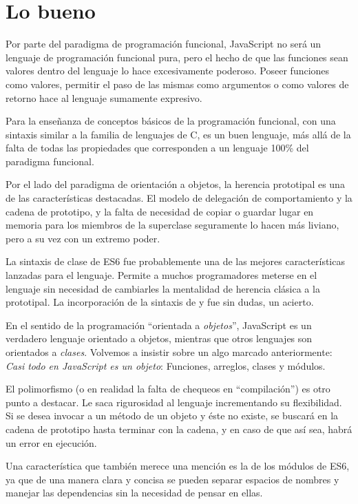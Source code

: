 \section{Lo bueno}

Por parte del paradigma de programación funcional, JavaScript no será un lenguaje de programación funcional pura, pero el hecho de que las funciones sean valores dentro del lenguaje lo hace excesivamente poderoso. Poseer funciones como valores, permitir el paso de las mismas como argumentos o como valores de retorno hace al lenguaje sumamente expresivo.

Para la enseñanza de conceptos básicos de la programación funcional, con una sintaxis similar a la familia de lenguajes de C, es un buen lenguaje, más allá de la falta de todas las propiedades que corresponden a un lenguaje 100\% del paradigma funcional.

Por el lado del paradigma de orientación a objetos, la herencia prototipal es una de las características destacadas. El modelo de delegación de comportamiento y la cadena de prototipo, y la falta de necesidad de copiar o guardar lugar en memoria para los miembros de la superclase seguramente lo hacen más liviano, pero a su vez con un extremo poder.
 
La sintaxis de clase de ES6 fue probablemente una de las mejores características lanzadas para el lenguaje. Permite a muchos programadores meterse en el lenguaje sin necesidad de cambiarles la mentalidad de herencia clásica a la prototipal. La incorporación de la sintaxis de  y  fue sin dudas, un acierto.

En el sentido de la programación "`orientada a \textit{objetos}"', JavaScript es un verdadero lenguaje orientado a objetos, mientras que otros lenguajes son orientados a \textit{clases}. Volvemos a insistir sobre un algo marcado anteriormente: \textit{Casi todo en JavaScript es un objeto}: Funciones, arreglos, clases y módulos.

El polimorfismo (o en realidad la falta de chequeos en "`compilación"') es otro punto a destacar. Le saca rigurosidad al lenguaje incrementando su flexibilidad. Si se desea invocar a un método de un objeto y éste no existe, se buscará en la cadena de prototipo hasta terminar con la cadena, y en caso de que así sea, habrá un error en ejecución.

Una característica que también merece una mención es la de los módulos de ES6, ya que de una manera clara y concisa se pueden separar espacios de nombres y manejar las dependencias sin la necesidad de pensar en ellas.
